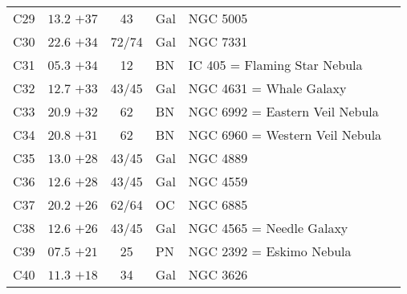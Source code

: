 \begin{table}[p]
\begin{tabular}{lcclll}
C29  &$13.2$ $+37$&43&Gal&NGC 5005\\
C30  &$22.6$ $+34$&72/74&Gal&NGC 7331\\
C31  &$05.3$ $+34$&12&BN &IC 405 = Flaming Star Nebula\\
C32  &$12.7$ $+33$&43/45&Gal&NGC 4631 = Whale Galaxy\\
C33  &$20.9$ $+32$&62&BN &NGC 6992 = Eastern Veil Nebula\\
C34  &$20.8$ $+31$&62&BN &NGC 6960 = Western Veil Nebula\\
C35  &$13.0$ $+28$&43/45&Gal&NGC 4889\\
C36  &$12.6$ $+28$&43/45&Gal&NGC 4559\\
C37  &$20.2$ $+26$&62/64&OC &NGC 6885\\
C38  &$12.6$ $+26$&43/45&Gal&NGC 4565 = Needle Galaxy\\
C39  &$07.5$ $+21$&25&PN &NGC 2392 = Eskimo Nebula\\
C40  &$11.3$ $+18$&34&Gal&NGC 3626\\
\hline
\end{tabular}
\end{table}

